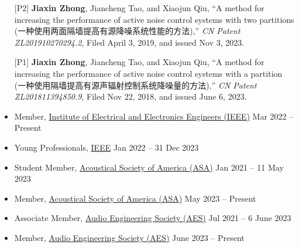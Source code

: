 \documentclass[10pt,a4paper,ragged2e,withhyper]{altacv}
\newcommand{\PubConference}[1]{\textit{#1}}
\newcommand{\PubTitle}[1]{``{#1,}''}
\newcommand{\PubMe}[1]{\textbf{#1}}
\newcommand{\hrefhl}[2]{{\color{accent}\href{#1}{#2}}}
\begin{document}
\divider


\begin{itemize}[leftmargin = 25pt]
    \item[{[P2]}] \PubMe{Jiaxin Zhong}, Jiancheng Tao, and Xiaojun Qiu,
    \PubTitle{A method for increasing the performance of active noise control systems with two partitions (一种使用两面隔墙提高有源降噪系统性能的方法)}
    \PubConference{CN Patent ZL201910270294.2},
    Filed April 3, 2019, and issued Nov 3, 2023.
    \item[{[P1]}] \PubMe{Jiaxin Zhong}, Jiancheng Tao, and Xiaojun Qiu,
    \PubTitle{A method for increasing the performance of active noise control systems with a partition (一种使用隔墙提高有源声辐射控制系统降噪量的方法)}
    \PubConference{CN Patent ZL201811394850.9},
    Filed Nov 22, 2018, and issued June 6, 2023.
\end{itemize}



\begin{itemize}
    \item Member, \hrefhl{https://www.ieee.org/membership/index.html}{Institute of Electrical and Electronics Engineers (IEEE)} \hfill {} Mar 2022 -- Present

    \item Young Professionals, \hrefhl{https://yp.ieee.org/}{IEEE}
          \hfill {} Jan 2022 -- 31 Dec 2023

    \item Student Member, \hrefhl{https://acousticalsociety.org/asa-membership/}{Acoustical Society of America (ASA)}
          \hfill {} Jan 2021 -- 11 May 2023

    \item Member, \hrefhl{https://acousticalsociety.org/asa-membership/}{Acoustical Society of America (ASA)}
          \hfill {} May 2023 -- Present

    \item Associate Member, \hrefhl{https://aes2.org/aes-membership-overview/}{Audio Engineering Society (AES)}
          \hfill {} Jul 2021 -- 6 June 2023

    \item Member, \hrefhl{https://aes2.org/aes-membership-overview/}{Audio Engineering Society (AES)}
          \hfill {} June 2023 -- Present
\end{itemize}
\end{document}
